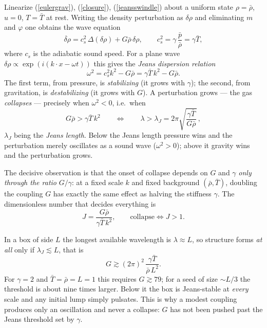 Linearize (\ref{eulergrav}), (\ref{closure}), (\ref{jeansswindle}) about a
uniform state $\rho =\bar\rho$, $u=0$, $T=\bar T$ at rest. Writing the density
perturbation as $\delta\rho$ and eliminating $m$ and $\varphi$ one obtains the
wave equation
\begin{equation}\label{waveeq}
\ddot{\delta\rho}=c_s^2\,\Delta(\delta\rho)+G\bar\rho\,\delta\rho,
\qquad c_s^2=\gamma\,\frac{\bar p}{\bar\rho}=\gamma\bar T,
\end{equation}
where $c_s$ is the adiabatic sound speed. For a plane wave
$\delta\rho\propto\exp(i(k\cdot x-\omega t))$ this gives the
\emph{Jeans dispersion relation}
\begin{equation}\label{dispersion}
\omega^2=c_s^2k^2-G\bar\rho=\gamma\bar T\,k^2-G\bar\rho .
\end{equation}
The first term, from pressure, is \emph{stabilizing} (it grows with $\gamma$);
the second, from gravitation, is \emph{destabilizing} (it grows with $G$). A
perturbation grows --- the gas \emph{collapses} --- precisely when
$\omega^2<0$, i.e.\ when
\begin{equation}\label{jeanscrit}
G\bar\rho>\gamma\bar T\,k^2
\qquad\Longleftrightarrow\qquad
\lambda>\lambda_J=2\pi\sqrt{\frac{\gamma\bar T}{G\bar\rho}}\, ,
\end{equation}
$\lambda_J$ being the \emph{Jeans length}. Below the Jeans length pressure wins
and the perturbation merely oscillates as a sound wave ($\omega^2>0$); above it
gravity wins and the perturbation grows.

The decisive observation is that the onset of collapse depends on $G$ and
$\gamma$ \emph{only through the ratio} $G/\gamma$: at a fixed scale $k$ and
fixed background $(\bar\rho ,\bar T)$, doubling the coupling $G$ has exactly the
same effect as halving the stiffness $\gamma$. The dimensionless number that
decides everything is
\begin{equation}\label{jeansnumber}
J=\frac{G\bar\rho}{\gamma\bar T\,k^2},
\qquad\text{collapse}\iff J>1 .
\end{equation}

In a box of side $L$ the longest available wavelength is $\lambda\approx L$, so
structure forms \emph{at all} only if $\lambda_J\lesssim L$, that is
\begin{equation}\label{boxthreshold}
G\gtrsim (2\pi)^2\,\frac{\gamma\bar T}{\bar\rho\,L^2}.
\end{equation}
For $\gamma =2$ and $\bar T=\bar\rho =L=1$ this requires $G\gtrsim 79$; for a
seed of size $\sim L/3$ the threshold is about nine times larger. Below it the
box is Jeans-stable at \emph{every} scale and any initial lump simply pulsates.
This is why a modest coupling produces only an oscillation and never a collapse:
$G$ has not been pushed past the Jeans threshold set by $\gamma$.

